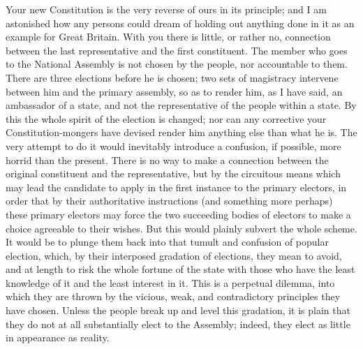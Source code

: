 Your new Constitution is the very reverse of ours in its principle; and I am astonished how any persons could dream of holding out anything done in it as an example for Great Britain. With you there is little, or rather no, connection between the last representative and the first constituent. The member who goes to the National Assembly is not chosen by the people, nor accountable to them. There are three elections before he is chosen; two sets of magistracy intervene between him and the primary assembly, so as to render him, as I have said, an ambassador of a state, and not the representative of the people within a state. By this the whole spirit of the election is changed; nor can any corrective your Constitution-mongers have devised render him anything else than what he is. The very attempt to do it would inevitably introduce a confusion, if possible, more horrid than the present. There is no way to make a connection between the original constituent and the representative, but by the circuitous means which may lead the candidate to apply in the first instance to the primary electors, in order that by their authoritative instructions (and something more perhaps) these primary electors may force the two succeeding bodies of electors to make a choice agreeable to their wishes. But this would plainly subvert the whole scheme. It would be to plunge them back into that tumult and confusion of popular election, which, by their interposed gradation of elections, they mean to avoid, and at length to risk the whole fortune of the state with those who have the least knowledge of it and the least interest in it. This is a perpetual dilemma, into which they are thrown by the vicious, weak, and contradictory principles they have chosen. Unless the people break up and level this gradation, it is plain that they do not at all substantially elect to the Assembly; indeed, they elect as little in appearance as reality.

